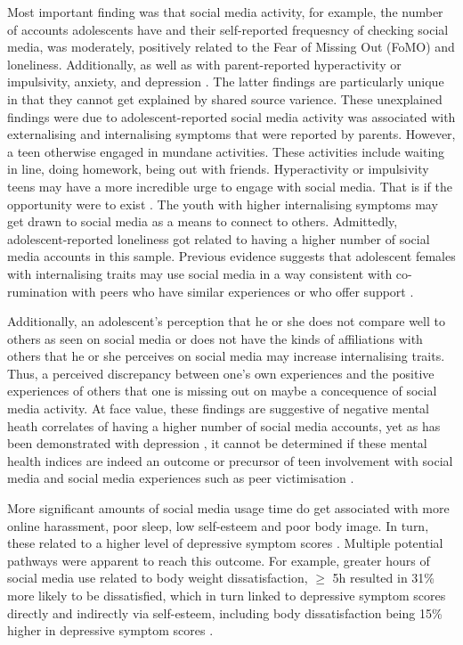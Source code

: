 \documentclass{sigchi}
\begin{document}
	Most important finding was that social media activity, for example, the number of accounts adolescents have and their self-reported frequesncy of checking social media, was moderately, positively related to the Fear of Missing Out (FoMO) and loneliness. Additionally, as well as with parent-reported hyperactivity or impulsivity, anxiety, and depression \cite{barry2017adolescent}. The latter findings are particularly unique in that they cannot get explained by shared source varience. These unexplained findings were due to adolescent-reported social media activity was associated with externalising and internalising symptoms that were reported by parents. However, a teen otherwise engaged in mundane activities. These activities include waiting in line, doing homework, being out with friends. Hyperactivity or impulsivity teens may have a more incredible urge to engage with social media. That is if the opportunity were to exist \cite{barry2017adolescent}. The youth with higher internalising symptoms may get drawn to social media as a means to connect to others. Admittedly, adolescent-reported loneliness got related to having a higher number of social media accounts in this sample. Previous evidence suggests that adolescent females with internalising traits may use social media in a way consistent with co-rumination with peers who have similar experiences or who offer support \cite{ehrenreich2016adolescents}.
	
	Additionally, an adolescent's perception that he or she does not compare well to others as seen on social media or does not have the kinds of affiliations with others that he or she perceives on social media may increase internalising traits. Thus, a perceived discrepancy between one's own experiences and the positive experiences of others that one is missing out on maybe a concequence of social media activity. At face value, these findings are suggestive of negative mental heath correlates of having a higher number of social media accounts, yet as has been demonstrated with depression \cite{frison2016short}, it cannot be determined if these mental health indices are indeed an outcome or precursor of teen involvement with social media and social media experiences such as peer victimisation \cite{barry2017adolescent}.

	More significant amounts of social media usage time do get associated with more online harassment, poor sleep, low self-esteem and poor body image. In turn, these related to a higher level of depressive symptom scores \cite{kelly2018social}. Multiple potential pathways were apparent to reach this outcome. For example, greater hours of social media use related to body weight dissatisfaction, $\geq$ 5h resulted in 31\% more likely to be dissatisfied, which in turn linked to depressive symptom scores directly and indirectly via self-esteem, including body dissatisfaction being 15\% higher in depressive symptom scores \cite{kelly2018social}.
\end{document}
